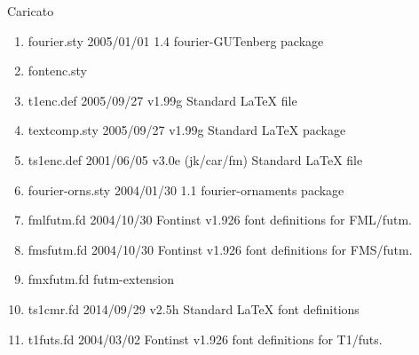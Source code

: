 Caricato 
\begin{enumerate}
\item fourier.sty 2005/01/01 1.4 fourier-GUTenberg package
\item fontenc.sty
\item t1enc.def 2005/09/27 v1.99g Standard LaTeX file
\item textcomp.sty 2005/09/27 v1.99g Standard LaTeX package
\item ts1enc.def 2001/06/05 v3.0e (jk/car/fm) Standard LaTeX file
\item fourier-orns.sty 2004/01/30 1.1 fourier-ornaments package
\item fmlfutm.fd 2004/10/30 Fontinst v1.926 font definitions for FML/futm.
\item fmsfutm.fd 2004/10/30 Fontinst v1.926 font definitions for FMS/futm.
\item fmxfutm.fd futm-extension
\item ts1cmr.fd 2014/09/29 v2.5h Standard LaTeX font definitions
\item t1futs.fd 2004/03/02 Fontinst v1.926 font definitions for T1/futs.
\end{enumerate} 
